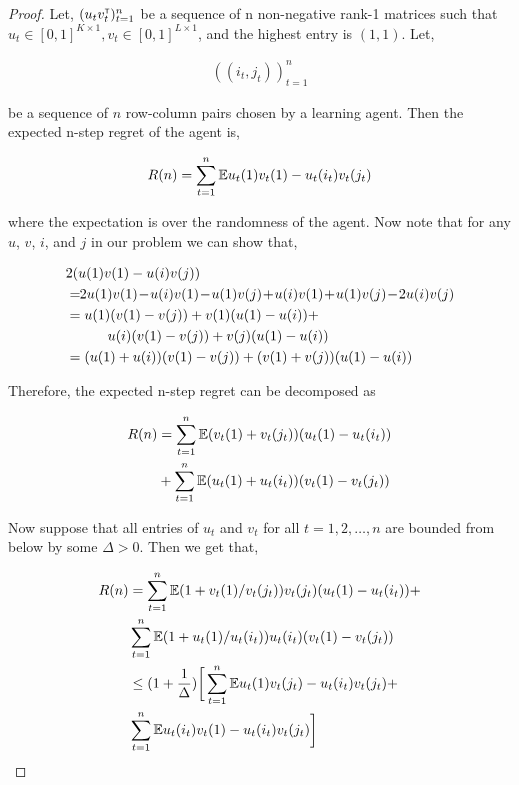 \begin{proof}
Let, $(u_t v_t^\mathsf{\scriptscriptstyle T})_{t = 1}^n$ be a sequence of n non-negative rank-1 matrices such that $u_t \in [0, 1]^{K \times 1}, v_t \in [0, 1]^{L \times 1}$, and the highest entry is $(1, 1)$. Let,

\begin{align*}
((i_t, j_t))_{t = 1}^n
\end{align*}

be a sequence of $n$ row-column pairs chosen by a learning agent. Then the expected n-step regret of the agent is,

\begin{align*}
R(n) = \sum_{t = 1}^n \mathbb{E}{u_t(1) v_t(1) - u_t(i_t) v_t(j_t)}
\end{align*}

where the expectation is over the randomness of the agent. Now note that for any $u$, $v$, $i$, and $j$ in our problem we can show that,

\begin{align*}
& 2 (u(1) v(1) - u(i) v(j))\\
& = \!\! 2 u(1) v(1) \! - \! u(i) v(1) \! - \! u(1) v(j) \! + \! u(i) v(1) \! + \! u(1) v(j) \! - \! 2 u(i) v(j) \\
& = u(1) (v(1) - v(j))  + v(1) (u(1) -  u(i))  +\\
& \hspace*{3em}  u(i) (v(1)  - v(j))  + v(j) (u(1)  - u(i)) \\
& = (u(1) + u(i)) (v(1) - v(j)) + (v(1) + v(j)) (u(1) - u(i))
\end{align*}

Therefore, the expected n-step regret can be decomposed as

\begin{align*}
R(n) &= \sum_{t = 1}^n \mathbb{E}{(v_t(1) + v_t(j_t)) (u_t(1) - u_t(i_t))} \\
&+ \sum_{t = 1}^n \mathbb{E}{(u_t(1) + u_t(i_t)) (v_t(1) - v_t(j_t))}
\end{align*}

Now suppose that all entries of $u_t$ and $v_t$ for all $t=1,2,\ldots, n$ are bounded from below by some $\Delta > 0$. Then we get that,

\begin{align*}
R(n)
& = \sum_{t = 1}^n \mathbb{E}{(1 + v_t(1) / v_t(j_t)) v_t(j_t) (u_t(1) - u_t(i_t))} +\\
&\sum_{t = 1}^n \mathbb{E}{(1 + u_t(1) / u_t(i_t)) u_t(i_t) (v_t(1) - v_t(j_t))} \\
& \leq (1 + \frac{1}{\Delta}) \bigg[\sum_{t = 1}^n \mathbb{E}{u_t(1) v_t(j_t) - u_t(i_t) v_t(j_t)} + \\
& \sum_{t = 1}^n \mathbb{E}{u_t(i_t) v_t(1) - u_t(i_t) v_t(j_t)}\bigg]
\end{align*}


\end{proof}
